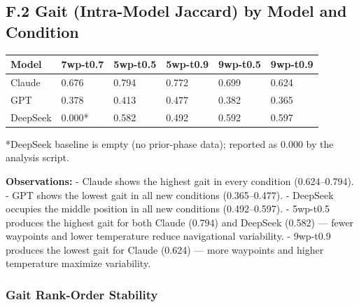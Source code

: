 \subsection{F.2 Gait (Intra-Model Jaccard) by Model and Condition}\label{f.2-gait-intra-model-jaccard-by-model-and-condition}

\begin{longtable}[]{@{}llllll@{}}
\toprule\noalign{}
Model & 7wp-t0.7 & 5wp-t0.5 & 5wp-t0.9 & 9wp-t0.5 & 9wp-t0.9 \\
\midrule\noalign{}
\endhead
\bottomrule\noalign{}
\endlastfoot
Claude & 0.676 & 0.794 & 0.772 & 0.699 & 0.624 \\
GPT & 0.378 & 0.413 & 0.477 & 0.382 & 0.365 \\
DeepSeek & 0.000* & 0.582 & 0.492 & 0.592 & 0.597 \\
\end{longtable}

*DeepSeek baseline is empty (no prior-phase data); reported as 0.000 by the analysis script.

\textbf{Observations:} - Claude shows the highest gait in every condition (0.624--0.794). - GPT shows the lowest gait in all new conditions (0.365--0.477). - DeepSeek occupies the middle position in all new conditions (0.492--0.597). - 5wp-t0.5 produces the highest gait for both Claude (0.794) and DeepSeek (0.582) --- fewer waypoints and lower temperature reduce navigational variability. - 9wp-t0.9 produces the lowest gait for Claude (0.624) --- more waypoints and higher temperature maximize variability.

\subsubsection{Gait Rank-Order Stability}\label{gait-rank-order-stability}

